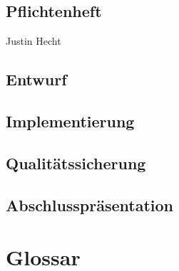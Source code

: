 \documentclass[a4paper]{scrreprt}
\begin{document}
\section{Pflichtenheft} Justin Hecht
\section{Entwurf} 
\section{Implementierung}
\section{Qualitätssicherung} 
\section{Abschlusspräsentation} 


\chapter{Glossar}
 

\printglossaries
 

\listoffigures
 
\end{document}
